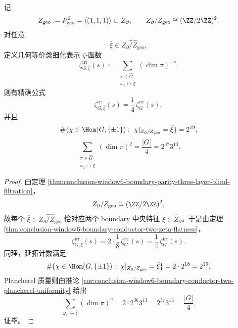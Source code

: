 \begin{proposition}\label{prop:conclusion-window6-boundary-conductor-two-geometric-quotient-flatness}
记
\[
Z_{\mathrm{geo}}:=P_{\mathrm{geo}}^6=\langle(1,1,1)\rangle\subset Z_{\partial},
\qquad
Z_{\partial}/Z_{\mathrm{geo}}\cong (\ZZ/2\ZZ)^2.
\]
对任意
\[
\bar\xi\in \widehat{Z_{\partial}/Z_{\mathrm{geo}}},
\]
定义几何等价类细化表示 \(\zeta\)-函数
\[
\zeta^{\mathrm{irr}}_{G,\bar\xi}(s)
:=
\sum_{\substack{\pi\in \widehat G\\ \omega_\pi\mapsto \bar\xi}}
(\dim\pi)^{-s}.
\]
则有精确公式
\[
\zeta^{\mathrm{irr}}_{G,\bar\xi}(s)=\frac14\,\zeta^{\mathrm{irr}}_{G}(s),
\]
并且
\[
\#\{\chi\in \Hom(G,\{\pm1\}):\ \chi|_{Z_{\partial}/Z_{\mathrm{geo}}}=\bar\xi\}=2^{19},
\]
\[
\sum_{\substack{\pi\in\widehat G\\ \omega_\pi\mapsto \bar\xi}}(\dim\pi)^2
=
\frac{|G|}{4}
=
2^{37}3^{13}.
\]
\end{proposition}
\begin{proof}
由定理 \ref{thm:conclusion-window6-boundary-parity-three-layer-blind-filtration}，
\[
Z_{\partial}/Z_{\mathrm{geo}}\cong (\ZZ/2\ZZ)^2,
\]
故每个 \(\bar\xi\in \widehat{Z_{\partial}/Z_{\mathrm{geo}}}\) 恰对应两个 boundary 中央特征 \(\xi\in \widehat Z_{\partial}\)。于是由定理 \ref{thm:conclusion-window6-boundary-conductor-two-zeta-flatness}，
\[
\zeta^{\mathrm{irr}}_{G,\bar\xi}(s)
=
2\cdot \frac18\,\zeta^{\mathrm{irr}}_{G}(s)
=
\frac14\,\zeta^{\mathrm{irr}}_{G}(s).
\]
同理，延拓计数满足
\[
\#\{\chi\in \Hom(G,\{\pm1\}):\ \chi|_{Z_{\partial}/Z_{\mathrm{geo}}}=\bar\xi\}
=
2\cdot 2^{18}
=
2^{19},
\]
Plancherel 质量则由推论 \ref{cor:conclusion-window6-boundary-conductor-two-plancherel-uniformity} 给出
\[
\sum_{\omega_\pi\mapsto \bar\xi}(\dim\pi)^2
=
2\cdot 2^{36}3^{13}
=
2^{37}3^{13}
=
\frac{|G|}{4}.
\]
证毕。
\end{proof}

